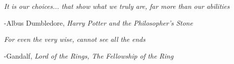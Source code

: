 \begin{flushleft}
\textit{It is our choices... that show what we truly are, far more than our abilities}
\end{flushleft}

\begin{flushright}
-Albus Dumbledore, \textit{Harry Potter and the Philosopher's Stone}
\end{flushright}
\vspace{1cm}
\begin{flushleft}
\textit{For even the very wise, cannot see all the ends}
\end{flushleft}

\begin{flushright}
-Gandalf, \textit{Lord of the Rings, The Fellowship of the Ring}
\end{flushright}

